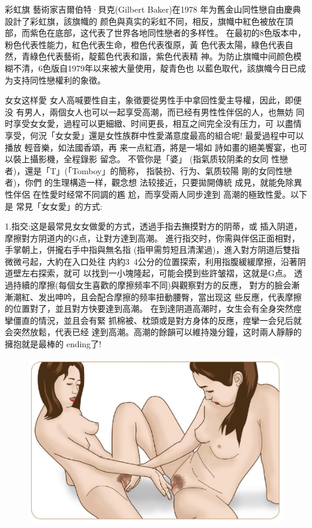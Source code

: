 \documentclass[12pt,UTF8]{ctexbook}
\begin{document}
彩虹旗
藝術家吉爾伯特·貝克(Gilbert Baker)在1978
年为舊金山同性戀自由慶典設計了彩虹旗，該旗幟的
颜色與真实的彩虹不同，相反，旗幟中紅色被放在頂
部，而紫色在底部，这代表了世界各地同性戀者的多样性。
在最初的8色版本中，粉色代表性能力，紅色代表生命，橙色代表復原，黃
色代表太陽，綠色代表自然，青綠色代表藝術，靛藍色代表和諧，紫色代表精
神。为防止旗幟中间颜色模糊不清，6色版自1979年以来被大量使用，靛青色也
以藍色取代，該旗幟今日已成为支持同性戀權利的象徵。

女女这样愛
女人高喊要性自主，象徵要從男性手中拿回性愛主导權，因此，即便没
有男人，兩個女人也可以一起享受高潮，而已经有男性性伴侶的人，也無妨
同时享受女女愛，過程可以更細緻、时间更長，相互之间完全没有压力，可
以盡情享受，何況「女女愛」還是女性族群中性愛滿意度最高的組合呢!
最愛過程中可以播放
輕音樂，如法國香頌，再
来一点紅酒，將是一場如
詩如畫的絕美饗宴，也可
以裝上攝影機，全程錄影
留念。
不管你是「婆」
(指氣质较阴柔的女同
性戀者)，還是「T」(「Tomboy」的簡称，
指裝扮、行为、氣质较陽
剛的女同性戀者)，你們
的生理構造一样，觀念想
法较接近，只要拋開傳統
成見，就能免除異性伴侶
在性愛时经常不同調的尷
尬，而享受兩人同步達到
高潮的極致性愛。以下是
常見「女女愛」的方式:

1.指交:这是最常見女女做愛的方式，透過手指去撫摸對方的阴蒂，或
插入阴道，摩擦對方阴道内的G点，让對方達到高潮。
進行指交时，你需與伴侶正面相對，手掌朝上，併攏右手中指與無名指
(指甲需剪短且清潔過)，進入對方阴道后雙指微微弓起，大約在入口处往
内約3~4公分的位置探索，利用指腹緩緩摩擦，沿著阴道壁左右探索，就可
以找到一小塊隆起，可能会摸到些許皱褶，这就是G点。
透過持續的摩擦(每個女生喜歡的摩擦频率不同)與觀察對方的反應，
對方的臉会漸漸潮紅、发出呻吟，且会配合摩擦的频率扭動腰臀，當出现这
些反應，代表摩擦的位置對了，並且對方快要達到高潮。
在到達阴道高潮时，女生会有全身突然痙攣僵直的情況，並且会有緊
抓棉被、枕頭或是對方身体的反應，痙攣一会兒后就会突然放鬆，代表已经
達到高潮。高潮的餘韻可以維持幾分鐘，这时兩人靜靜的擁抱就是最棒的
ending了!

\begin{figure}[htbp]
	\centering
	\includegraphics[width=0.7\linewidth]{10}
	\caption{}
	\label{fig:1}
\end{figure}
\end{document}
